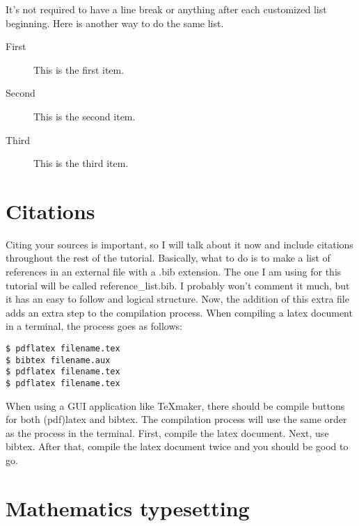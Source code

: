 \documentclass[11pt,letterpaper]{article}
\begin{document}
It's not required to have a line break or anything after each customized list
beginning. Here is another way to do the same list.

\begin{description}
    \item[First] This is the first item.
    \item[Second] This is the second item.
    \item[Third] This is the third item.
\end{description}

\section{Citations}

Citing your sources is important, so I will talk about it now and include
citations throughout the rest of the tutorial. Basically, what to do is to make
a list of references in an external file with a .bib extension. The one I am
using for this tutorial will be called reference\_list.bib. I probably won't
comment it much, but it has an easy to follow and logical structure. Now, the
addition of this extra file adds an extra step to the compilation process. When
compiling a latex document in a terminal, the process goes as follows:

\begin{verbatim}
$ pdflatex filename.tex
$ bibtex filename.aux
$ pdflatex filename.tex
$ pdflatex filename.tex
\end{verbatim}

When using a GUI application like TeXmaker, there should be compile buttons for
both (pdf)latex and bibtex. The compilation process will use the same order as
the process in the terminal. First, compile the latex document. Next, use
bibtex. After that, compile the latex document twice and you should be good to
go.

\section{Mathematics typesetting}
\end{document}
